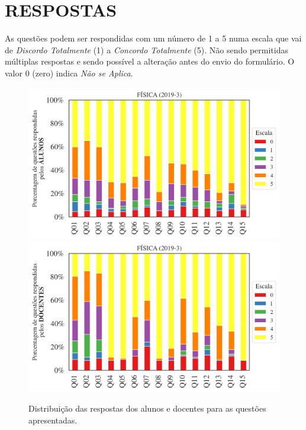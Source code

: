 \documentclass[a4paper,10pt]{article}
\begin{document}
\section{RESPOSTAS}
As questões podem ser respondidas com um número de 1 a 5 numa escala que vai de {\it Discordo Totalmente} (1) a {\it Concordo Totalmente} (5). Não sendo permitidas múltiplas respostas e sendo possível a alteração antes do envio do formulário. O valor 0 (zero) indica {\it Não se Aplica}.


\begin{figure}[h]
\centering
\includegraphics[width=0.999\linewidth]{resposta_alunos_questoes_curso_5000613.png}
\includegraphics[width=0.999\linewidth]{resposta_docentes_questoes_curso_5000613.png}
\caption{\label{fig:resposta_questoes_curso}Distribuição das respostas dos alunos e docentes para as questões apresentadas. }
\end{figure}
\end{document}
